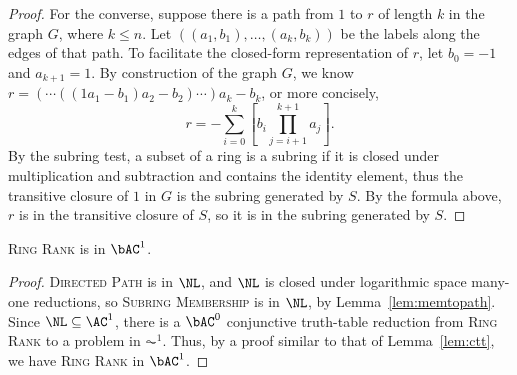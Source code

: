 \begin{proof}
  For the converse, suppose there is a path from $1$ to $r$ of length $k$ in the graph $G$, where $k \leq n$.
  Let $((a_1, b_1), \dotsc, (a_k, b_k))$ be the labels along the edges of that path.
  To facilitate the closed-form representation of $r$, let $b_0 = -1$ and $a_{k + 1} = 1$.
  By construction of the graph $G$, we know $r = (\dotsb ((1 a_1 - b_1) a_2 - b_2) \dotsb) a_k - b_k$, or more concisely,
  $$
    r = -\sum_{i = 0}^k \left[b_i \prod_{j = i + 1}^{k + 1} a_j\right].
  $$
  By the subring test, a subset of a ring is a subring if it is closed under multiplication and subtraction and contains the identity element, thus the transitive closure of $1$ in $G$ is the subring generated by $S$.
  By the formula above, $r$ is in the transitive closure of $S$, so it is in the subring generated by $S$.
\end{proof}

\begin{theorem}\label{thm:ringrank}
  \textsc{Ring Rank} is in $\bAC^1$.
\end{theorem}
\begin{proof}
  \textsc{Directed Path} is in $\NL$, and $\NL$ is closed under logarithmic space many-one reductions, so \textsc{Subring Membership} is in $\NL$, by Lemma~\ref{lem:memtopath}.
  Since $\NL \subseteq \AC^1$, there is a $\bAC^0$ conjunctive truth-table reduction from \textsc{Ring Rank} to a problem in $\AC^1$.
  Thus, by a proof similar to that of Lemma~\ref{lem:ctt}, we have \textsc{Ring Rank} in $\bAC^1$.
\end{proof}


